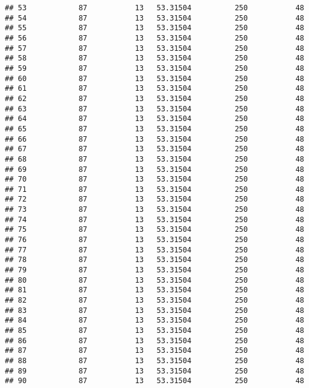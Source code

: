 \documentclass[]{article}
\begin{document}
\begin{verbatim}
## 53            87           13   53.31504          250           48
## 54            87           13   53.31504          250           48
## 55            87           13   53.31504          250           48
## 56            87           13   53.31504          250           48
## 57            87           13   53.31504          250           48
## 58            87           13   53.31504          250           48
## 59            87           13   53.31504          250           48
## 60            87           13   53.31504          250           48
## 61            87           13   53.31504          250           48
## 62            87           13   53.31504          250           48
## 63            87           13   53.31504          250           48
## 64            87           13   53.31504          250           48
## 65            87           13   53.31504          250           48
## 66            87           13   53.31504          250           48
## 67            87           13   53.31504          250           48
## 68            87           13   53.31504          250           48
## 69            87           13   53.31504          250           48
## 70            87           13   53.31504          250           48
## 71            87           13   53.31504          250           48
## 72            87           13   53.31504          250           48
## 73            87           13   53.31504          250           48
## 74            87           13   53.31504          250           48
## 75            87           13   53.31504          250           48
## 76            87           13   53.31504          250           48
## 77            87           13   53.31504          250           48
## 78            87           13   53.31504          250           48
## 79            87           13   53.31504          250           48
## 80            87           13   53.31504          250           48
## 81            87           13   53.31504          250           48
## 82            87           13   53.31504          250           48
## 83            87           13   53.31504          250           48
## 84            87           13   53.31504          250           48
## 85            87           13   53.31504          250           48
## 86            87           13   53.31504          250           48
## 87            87           13   53.31504          250           48
## 88            87           13   53.31504          250           48
## 89            87           13   53.31504          250           48
## 90            87           13   53.31504          250           48

\end{verbatim}
\end{document}
